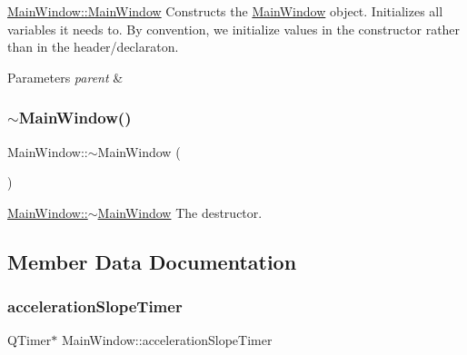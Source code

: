 \hyperlink{class_main_window_a8b244be8b7b7db1b08de2a2acb9409db}{Main\+Window\+::\+Main\+Window} Constructs the \hyperlink{class_main_window}{Main\+Window} object. Initializes all variables it needs to. By convention, we initialize values in the constructor rather than in the header/declaraton. 


\begin{DoxyParams}{Parameters}
{\em parent} & \\
\hline
\end{DoxyParams}
\hypertarget{class_main_window_ae98d00a93bc118200eeef9f9bba1dba7}{}\label{class_main_window_ae98d00a93bc118200eeef9f9bba1dba7} 
\subsubsection{\texorpdfstring{$\sim$\+Main\+Window()}{~MainWindow()}}
{\footnotesize\ttfamily Main\+Window\+::$\sim$\+Main\+Window (\begin{DoxyParamCaption}{ }\end{DoxyParamCaption})}



\hyperlink{class_main_window_ae98d00a93bc118200eeef9f9bba1dba7}{Main\+Window\+::$\sim$\+Main\+Window} The destructor. 



\subsection{Member Data Documentation}
\hypertarget{class_main_window_a61e3faf86f0c2bd56921aacdd4e64c68}{}\label{class_main_window_a61e3faf86f0c2bd56921aacdd4e64c68} 
\subsubsection{\texorpdfstring{acceleration\+Slope\+Timer}{accelerationSlopeTimer}}
{\footnotesize\ttfamily Q\+Timer$\ast$ Main\+Window\+::acceleration\+Slope\+Timer}

\hypertarget{class_main_window_a6382bf386001d617cd5b717a92c5004d}{}\label{class_main_window_a6382bf386001d617cd5b717a92c5004d} 
